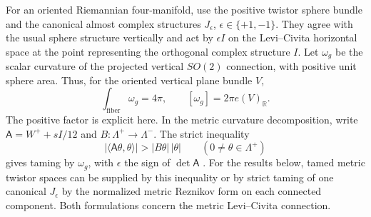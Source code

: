 \documentclass[11pt]{article}
\numberwithin{equation}{section}
\theoremstyle{definition}
\theoremstyle{remark}
\newcommand{\R}{\mathbb R}
\begin{document}
For an oriented Riemannian four-manifold, use the positive
twistor sphere bundle and the canonical almost complex
structures $J_\epsilon$, $\epsilon\in\{+1,-1\}$.
They agree with the usual sphere structure vertically and act
by $\epsilon I$ on the Levi--Civita horizontal space at the
point representing the orthogonal complex structure $I$.
Let $\omega_g$ be the scalar curvature of the projected
vertical $SO(2)$ connection, with positive unit sphere area.
Thus, for the oriented vertical plane bundle $V$,
\begin{equation}\label{eq:twistor-euler-normalization}
 \int_{\text{fiber}}\omega_g=4\pi,\qquad
 [\omega_g]=2\pi e(V)_{\R}.
\end{equation}
The positive factor is explicit here. In the metric curvature
decomposition, write $\mathsf A=W^++sI/12$ and
$B:\Lambda^+\to\Lambda^-$. The strict inequality
\begin{equation}\label{eq:metric-twistor-taming}
 |\langle\mathsf A\theta,\theta\rangle|>|B\theta|\,|\theta|
 \qquad(0\ne\theta\in\Lambda^+)
\end{equation}
gives taming by $\omega_g$, with $\epsilon$ the sign of
$\det\mathsf A$ \cite[Theorem~1]{Fine2017TwistorLimits}.
For the results below, tamed metric twistor spaces can be
supplied by this inequality or by strict taming of one canonical
$J_\epsilon$ by the normalized metric Reznikov form on each
connected component. Both formulations concern the metric
Levi--Civita connection.
\end{document}
